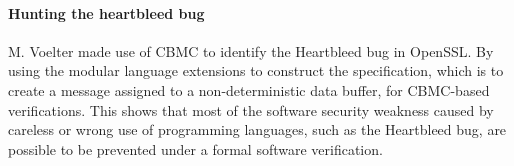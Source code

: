 \paragraph{Hunting the heartbleed bug}
M. Voelter \cite{Voelter:2015:TIS:2846696.2846698} made use of CBMC to identify the Heartbleed bug in OpenSSL. By using the modular language extensions to construct the specification, which is to create a message assigned to a non-deterministic data buffer, for CBMC-based verifications. This shows that most of the software security weakness caused by careless or wrong use of programming languages, such as the Heartbleed bug, are possible to be prevented under a formal software verification.
